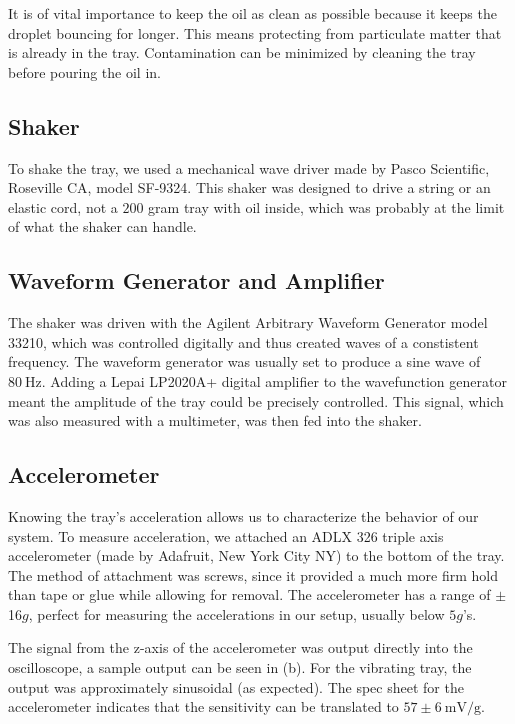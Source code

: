     It is of vital importance to keep the oil as clean as possible because it keeps the droplet bouncing for longer. This means protecting from particulate matter that is already in the tray. Contamination can be minimized by cleaning the tray before pouring the oil in.
    
\subsection{Shaker}
    To shake the tray, we used a mechanical wave driver made by Pasco Scientific, Roseville CA, model SF-9324. This shaker was designed to drive a string or an elastic cord, not a $200$ gram tray with oil inside, which was probably at the limit of what the shaker can handle. 

\subsection{Waveform Generator and Amplifier}
    The shaker was driven with the Agilent Arbitrary Waveform Generator model 33210, which was controlled digitally and thus created waves of a constistent frequency. The waveform generator was usually set to produce a sine wave of $80~\mathrm{Hz}$. Adding a Lepai LP2020A+ digital amplifier to the wavefunction generator meant the amplitude of the tray could be precisely controlled. This signal, which was also measured with a multimeter, was then fed into the shaker.    
            
\subsection{Accelerometer}  
    Knowing the tray's acceleration allows us to characterize the behavior of our system. To measure acceleration, we attached an ADLX 326 triple axis accelerometer (made by Adafruit, New York City NY) to the bottom of the tray. The method of attachment was screws, since it provided a much more firm hold than tape or glue while allowing for removal. The accelerometer has a range of $\pm$16$g$, perfect for measuring the accelerations in our setup, usually below $5g$'s. 
      
      The signal from the z-axis of the accelerometer was output directly into the oscilloscope, a sample output can be seen in (b). For the vibrating tray, the output was approximately sinusoidal (as expected). The spec sheet for the accelerometer indicates that the sensitivity can be translated to $57 \pm 6~\mathrm{mV/g}$. 
    
